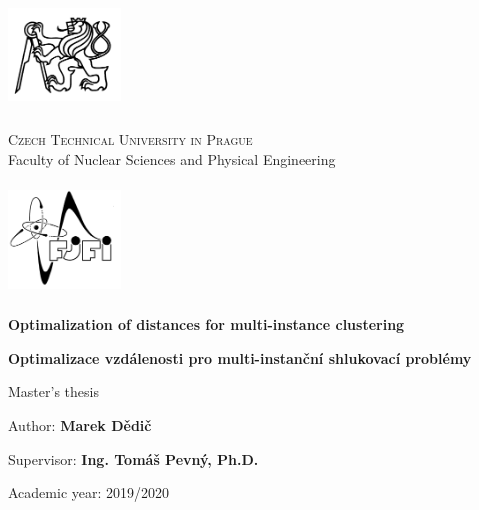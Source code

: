 \begin{center}
	\begin{minipage}{3cm}
		\includegraphics[width=3cm,height=3cm,keepaspectratio]{images/titlepage/cvut}
	\end{minipage}
	\begin{minipage}{0.6\linewidth}
		\begin{center}
			\textsc{\large Czech Technical University in Prague}\\
			{\large Faculty of Nuclear Sciences and Physical Engineering}
		\end{center}
	\end{minipage}
	\begin{minipage}{3cm}
		\includegraphics[width=3cm,height=3cm,keepaspectratio]{images/titlepage/fjfi}
	\end{minipage}

	\vspace{3.3cm}

	\textbf{\huge Optimalization of distances for multi-instance clustering}
	\vspace{1.1cm}

	\textenglish{\textbf{\huge Optimalizace vzdálenosti pro multi-instanční shlukovací problémy}}
	\vspace{1.7cm}

	{\large Master's thesis}
\end{center}

\vfill

\begin{list}{}{
	\settowidth{\labelwidth}{MMMMMMMMM}
	\setlength{\leftmargin}{\labelwidth}
	\renewcommand{\makelabel}[1]{#1\hfil}}
	\item [{Author:}] \textbf{Marek Dědič}
	\item [{Supervisor:}] \textbf{Ing. Tomáš Pevný, Ph.D.}
	\item [{Academic year:}] 2019/2020
\end{list}
